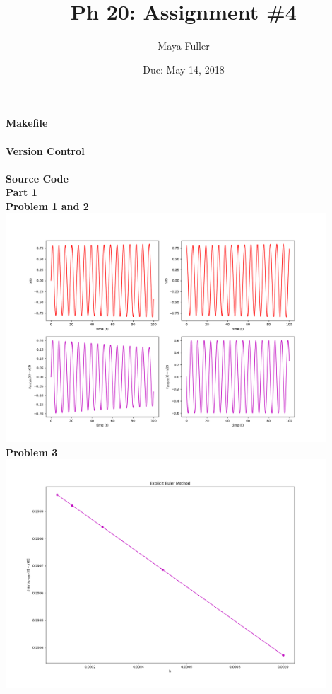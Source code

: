 \documentclass[12pt]{article}
\title{Ph 20: Assignment \#4}
\author{Maya Fuller}
\date{Due: May 14, 2018} %
\begin{document}
	
	
	\maketitle

	\noindent\textbf{\large Makefile}\\
	\\
	
	\noindent\textbf{\large Version Control}\\
	\\
	
	\noindent\textbf{\large Source Code}\\
	
	
	\noindent\textbf{\large Part 1}\\
	
	\indent\textbf{Problem 1 and 2}\\
		\includegraphics[width=0.9\textwidth]{vstimePlots.png}\\
		
	\indent\textbf{Problem 3}\\
		\includegraphics[width=0.9\textwidth]{errorPlot.png}\\
		
\end{document}
